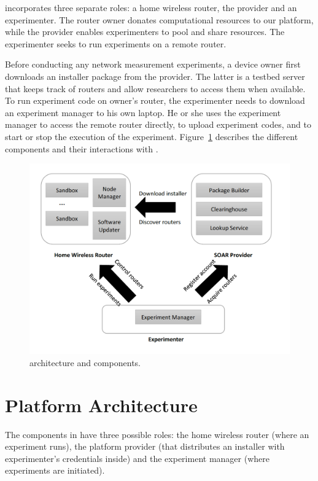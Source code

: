 \sysname incorporates three separate roles: a home wireless router, the \sysname provider
and an experimenter. The router owner donates computational resources to our platform,
while the \sysname provider enables experimenters to pool and share resources.
The experimenter seeks to run experiments on a remote router.

Before conducting any network measurement experiments, a device owner first downloads
 an installer package from the  \sysname provider. The latter is a testbed server
 that keeps track of routers and allow researchers to access them when available.
  To run experiment code on owner's router, the experimenter needs to download
  an experiment manager to his own laptop. He or she uses the experiment manager
   to access the remote router directly, to upload experiment codes, and to start
    or stop the execution of the experiment. Figure~\ref{fig-arch} describes
     the different components and their interactions with \sysname.

\begin{figure}%
\centering
\includegraphics[width=0.8\columnwidth]{figure/soar-arch.png}
\caption{\sysname architecture and components.}
\label{fig-arch}
\end{figure}

\section{Platform Architecture}
The components in \sysname have three possible roles: the home wireless router
(where an experiment runs), the platform provider (that distributes an installer with experimenter's credentials inside) and the experiment manager (where experiments are initiated).

